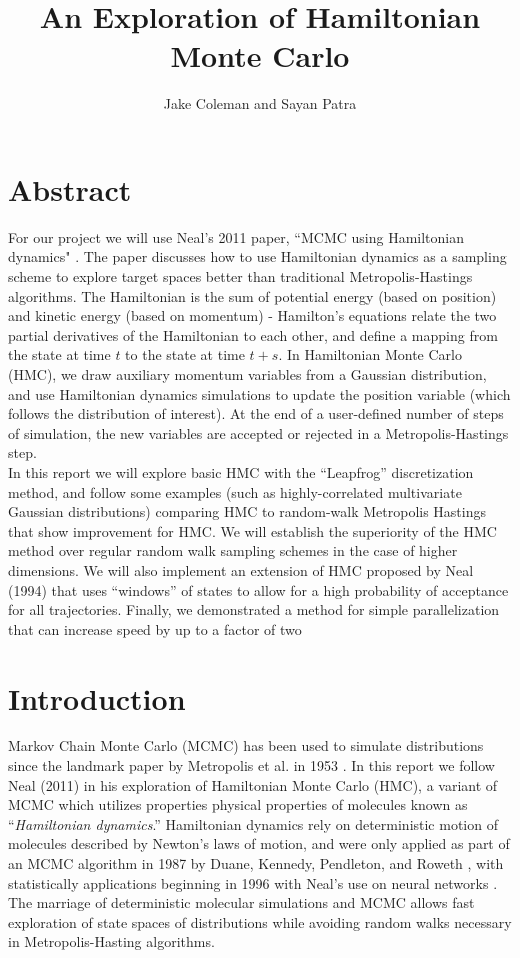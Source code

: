 \documentclass{article}
\title{An Exploration of Hamiltonian Monte Carlo}
\author{Jake Coleman and Sayan Patra}
\date{}
\numberwithin{equation}{section}
\begin{document}
\maketitle

\section{Abstract}
For our project we will use Neal's 2011 paper, ``MCMC using Hamiltonian dynamics" \cite{main}. The paper discusses how to use Hamiltonian dynamics as a sampling scheme to explore target spaces better than traditional Metropolis-Hastings algorithms. The Hamiltonian is the sum of potential energy (based on position) and kinetic energy (based on momentum) - Hamilton's equations relate the two partial derivatives of the Hamiltonian to each other, and define a mapping from the state at time $t$ to the state at time $t + s$. In Hamiltonian Monte Carlo (HMC), we draw auxiliary momentum variables from a Gaussian distribution, and use Hamiltonian dynamics simulations to update the position variable (which follows the distribution of interest). At the end of a user-defined number of steps of simulation, the new variables are accepted or rejected in a Metropolis-Hastings step.\\

In this report we will explore basic HMC with the ``Leapfrog'' discretization method, and follow some examples (such as highly-correlated multivariate Gaussian distributions) comparing HMC to random-walk Metropolis Hastings that show improvement for HMC. We will establish the superiority of the HMC method over regular random walk sampling schemes in the case of higher dimensions. We will also implement an extension of HMC proposed by Neal (1994) that uses ``windows'' of states to allow for a high probability of acceptance for all trajectories. Finally, we demonstrated a method for simple parallelization that can increase speed by up to a factor of two

\section{Introduction}
Markov Chain Monte Carlo (MCMC) has been used to simulate distributions since the landmark paper by Metropolis et al. in 1953 \cite{metrop}. In this report we follow Neal (2011) \cite{main} in his exploration of Hamiltonian Monte Carlo (HMC), a variant of MCMC which utilizes properties physical properties of molecules known as ``\textit{Hamiltonian dynamics}.'' Hamiltonian dynamics rely on deterministic motion of molecules described by Newton's laws of motion, and were only applied as part of an MCMC algorithm in 1987 by Duane, Kennedy, Pendleton, and Roweth \cite{og_hmc}, with statistically applications beginning in 1996 with Neal's use on neural networks \cite{neural}.  The marriage of deterministic molecular simulations and MCMC allows fast exploration of state spaces of distributions while avoiding random walks necessary in Metropolis-Hasting algorithms.\\
\end{document}

